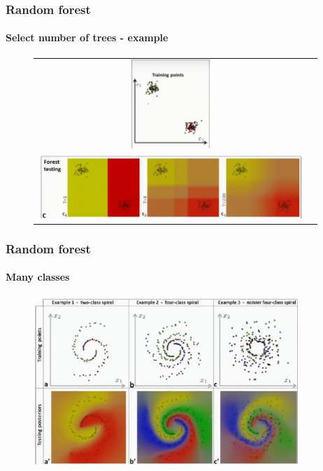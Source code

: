 \begin{frame}
	\frametitle{Random forest}
		\framesubtitle{Select number of trees - example}
	
		\begin{center}
		\begin{figure}[h]
		\begin{tabular}{cc}
		\includegraphics[width=3cm]{./figures/training_points}
		\\
		\includegraphics[width=10cm]{./figures/forest_testing}
		\end{tabular}
		\end{figure}
		\end{center}

\end{frame}

\begin{frame}
	\frametitle{Random forest}
		\framesubtitle{Many classes}
	
		\vfill
		
		\begin{figure}
			\includegraphics[width=10cm]{./figures/many_classes}
		\end{figure}

\end{frame}

